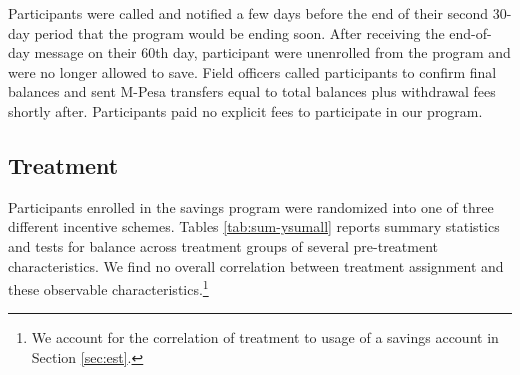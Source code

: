 \documentclass[12pt]{article}
\begin{document}
		Participants were called and notified a few days before the end of their second 30-day period that the program would be ending soon. After receiving the end-of-day message on their 60th day, participant were unenrolled from the program and were no longer allowed to save. Field officers called participants to confirm final balances and sent M-Pesa transfers equal to total balances plus withdrawal fees shortly after. Participants paid no explicit fees to participate in our program.

	\subsection{Treatment} \label{sec:treat}

		Participants enrolled in the savings program were randomized into one of three different incentive schemes. Tables \ref{tab:sum-ysumall} reports summary statistics and tests for balance across treatment groups of several pre-treatment characteristics. We find no overall  correlation between treatment assignment and these observable characteristics.\footnote{We account for the correlation of treatment to usage of a savings account in Section \ref{sec:est}.}
\end{document}
